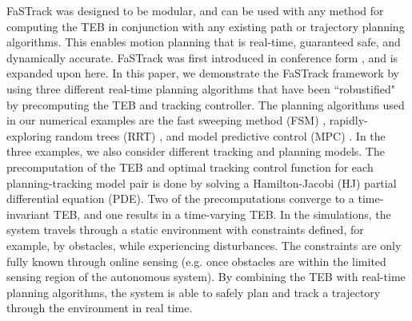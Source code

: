 FaSTrack was designed to be modular, and can be used with any method for computing the TEB in conjunction with any existing path or trajectory planning algorithms.  
This enables motion planning that is real-time, guaranteed safe, and dynamically accurate. 
FaSTrack was first introduced in conference form \cite{herbert2017fastrack}, and is expanded upon here. In this paper, we demonstrate the FaSTrack framework by using three different real-time planning algorithms that have been ``robustified" by precomputing the TEB and tracking controller. 
The planning algorithms used in our numerical examples are the fast sweeping method (FSM) \cite{Takei2013}, rapidly-exploring random trees (RRT) \cite{Kuffner2000,Kavraki1996}, and model predictive control (MPC) \cite{Qin2003,Zhang2017}. 
In the three examples, we also consider different tracking and planning models.
The precomputation of the TEB and optimal tracking control function for each planning-tracking model pair is done by solving a Hamilton-Jacobi (HJ) partial differential equation (PDE). 
Two of the precomputations converge to a time-invariant TEB, and one results in a time-varying TEB.
In the simulations, the system travels through a static environment with constraints defined, for example, by obstacles, while experiencing disturbances.
The constraints are only fully known through online sensing (e.g. once obstacles are within the limited sensing region of the autonomous system). 
By combining the TEB with real-time planning algorithms, the system is able to safely plan and track a trajectory through the environment in real time. 
